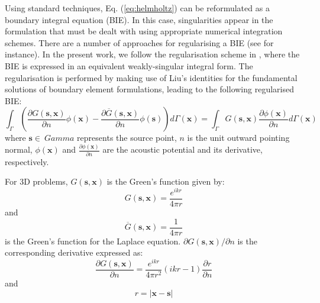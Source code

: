 \documentclass[review]{elsarticle}
\begin{document}
Using standard techniques, Eq. (\ref{eq:helmholtz}) can be reformulated as a boundary integral equation (BIE). In this case, singularities appear in the formulation that must be dealt with using appropriate numerical integration schemes. There are a number of approaches for regularising a BIE (see \cite{KARAMI1999317,NME:NME1620360205,NME:NME1620100503,SLADEK1998251,NME:NME1620240908} for instance). In the present work, we follow the regularisation scheme in \cite{Simpson1}, where the BIE is expressed in an equivalent weakly-singular integral form. 
The regularisation is performed by making use of Liu's identities \cite{Liu} for the fundamental solutions of boundary element formulations, leading to the following regularised BIE: 
\begin{equation}
\int_\Gamma\left(\frac{\partial{G(\mathbf{s},\mathbf{x})}}{\partial{n}}\phi(\mathbf{x})-\frac{\partial{\overline{G}(\mathbf{s},\mathbf{x})}}{\partial{n}}\phi(\mathbf{s})\right)d\Gamma(\mathbf{x})=\int_\Gamma G(\mathbf{s},\mathbf{x})\frac{\partial{\phi(\mathbf{x})}}{\partial{n}}d\Gamma(\mathbf{x})
\label{eq:final_regularization}
\end{equation}
where $\mathbf{s} \in\ Gamma$ represents the source point, $n$ is the unit outward pointing normal, $\phi(\mathbf{x})$ and $\frac{\partial{\phi(\mathbf{x})}}{\partial{n}}$ are the acoustic potential and its derivative, respectively. 

For 3D problems, $G(\mathbf{s},\mathbf{x})$ is the Green's function given by:
\begin{equation}
G(\mathbf{s},\mathbf{x})=\frac{e^{ikr}}{4\pi r}
\end{equation}
and
\begin{equation}
\overline{G}(\mathbf{s},\mathbf{x})= \frac{1}{4\pi r}
\label{eq:Laplace}
\end{equation}
is the Green's function for the Laplace equation.
$\partial{G(\mathbf{s},\mathbf{x})}/\partial{n} $ is the corresponding derivative expressed as:   
\begin{equation}
\frac{\partial{G(\mathbf{s},\mathbf{x})}}{\partial{n}}=\frac{e^{ikr}}{4\pi r^2}\left(ikr-1\right)\frac{\partial{r}}{\partial{n}}
\end{equation}
and 
\begin{equation}
r=\left|\mathbf{x}-\mathbf{s}\right|
\end{equation}
\end{document}
